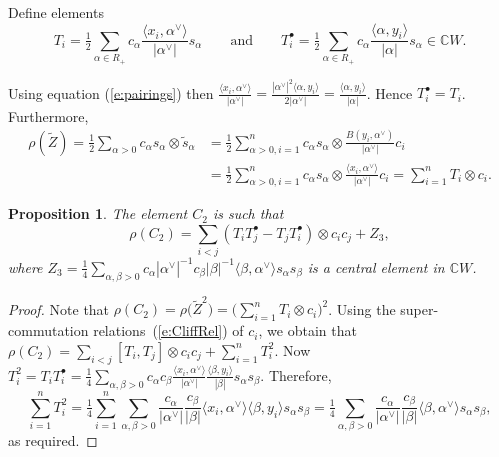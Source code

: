 \documentclass[pdftex]{sigma}
\numberwithin{equation}{section}
\newtheorem{Proposition}[Theorem]{Proposition}
 { \theoremstyle{definition}
\newtheorem{Definition}[Theorem]{Definition}
\newtheorem{Note}[Theorem]{Note}
\newtheorem{Example}[Theorem]{Example}
\newtheorem{Remark}[Theorem]{Remark} }
\begin{document}
\begin{Definition}
Define elements
\[T_i = \tfrac{1}{2}\sum_{\alpha \in R_+} c_\alpha \frac{\langle x_i,\alpha^\vee\rangle}{|\alpha^\vee|} s_\alpha \qquad \text{and}\qquad T_i^\bullet =\tfrac{1}{2} \sum_{\alpha \in R_+} c_\alpha \frac{\langle \alpha,y_i\rangle}{|\alpha|} s_\alpha \in \mathbb{C}W.\] \end{Definition}
Using equation (\ref{e:pairings}) then $\frac{\langle x_i,\alpha^\vee \rangle}{|\alpha^\vee|} = \frac{|\alpha^\vee|^2\langle \alpha,y_i\rangle}{2|\alpha^\vee|} = \frac{\langle \alpha,y_i\rangle}{|\alpha|}$. Hence $T_i^\bullet =T_i$. Furthermore,
\begin{align*}
\rho(\tilde{Z}) = \tfrac{1}{2}\sum_{\alpha >0} c_\alpha s_\alpha \otimes \tilde{s}_\alpha &= \tfrac{1}{2}\sum_{\alpha >0, i =1}^n c_\alpha s_\alpha \otimes \frac{B(y_i,\alpha^\vee)}{|\alpha^\vee|}c_i \\
&= \tfrac{1}{2}\sum_{\alpha >0, i =1}^n c_\alpha s_\alpha \otimes \frac{\langle x_i,\alpha^\vee\rangle }{|\alpha^\vee|}c_i = \sum_{i=1}^n T_i \otimes c_i.
\end{align*}

\begin{Proposition}
The element $C_2$ is such that
\[\rho(C_2) = \sum_{i <j} (T_iT_j^\bullet - T_jT_i^\bullet)\otimes c_ic_j + Z_3,
\]
where $Z_3 = \tfrac{1}{4}\sum_{\alpha ,\beta >0}c_\alpha |\alpha^\vee|^{-1} c_\beta |\beta|^{-1} \langle \beta,\alpha^\vee\rangle s_\alpha s_\beta$ is a central element in $\mathbb{C}W$.
\end{Proposition}

\begin{proof}
Note that $\rho(C_2) = \rho\big(\tilde{Z}^2\big) = \big(\sum_{i=1}^n T_i \otimes c_i\big)^2$. Using the super-commutation relations~(\ref{e:CliffRel}) of $c_i$, we obtain that
$\rho(C_2) = \sum_{i<j} [T_i,T_j] \otimes c_ic_j + \sum_{i=1}^n T_i^2$.
Now $T_i^2 = T_iT_i^\bullet = \tfrac{1}{4}\sum_{\alpha ,\beta >0}c_\alpha c_\beta \frac{ \langle x_i,\alpha^\vee\rangle}{|\alpha^\vee|}\frac{\langle \beta,y_i\rangle}{|\beta|} s_\alpha s_\beta$. Therefore,
\[
\sum_{i=1}^n T_i^2 =\tfrac{1}{4}\sum_{i=1}^n \sum_{\alpha ,\beta >0}\frac{c_\alpha}{|\alpha^\vee|} \frac{c_\beta}{|\beta|} \langle x_i,\alpha^\vee\rangle \langle \beta,y_i\rangle s_\alpha s_\beta
= \tfrac{1}{4}\sum_{\alpha ,\beta >0}\frac{c_\alpha}{|\alpha^\vee|} \frac{c_\beta}{|\beta|} \langle \beta,\alpha^\vee\rangle s_\alpha s_\beta ,\]
as required.
\end{proof}
\end{document}
